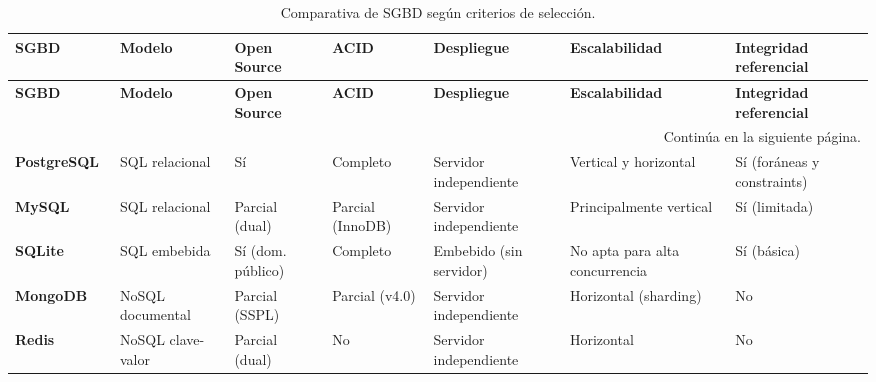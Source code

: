 \begin{center}
	\setlength{\tabcolsep}{4pt}
	\begin{longtable}{|p{2.3cm}|p{2cm}|p{1.3cm}|p{1.5cm}|p{2cm}|p{2.5cm}|p{2cm}|}
		\caption{Comparativa de SGBD según criterios de selección.}
		\label{tab:comparacion-bd} \\
		
		\hline
		\small\textbf{SGBD} &
		\small\textbf{Modelo} &
		\small\textbf{Open Source} &
		\small\textbf{ACID} &
		\small\textbf{Despliegue} &
		\small\textbf{Escalabilidad} &
		\small\textbf{Integridad referencial} \\
		\hline
		\endfirsthead
		
		\hline
		\small\textbf{SGBD} &
		\small\textbf{Modelo} &
		\small\textbf{Open Source} &
		\small\textbf{ACID} &
		\small\textbf{Despliegue} &
		\small\textbf{Escalabilidad} &
		\small\textbf{Integridad referencial} \\
		\hline
		\endhead
		
		\hline
		\multicolumn{7}{r}{\small Continúa en la siguiente página.} \\
		\endfoot
		
		\hline
		\endlastfoot
		
		\small\textbf{PostgreSQL}~\cite{postgresql}
		& \small SQL relacional
		& \small Sí
		& \small Completo
		& \small Servidor independiente
		& \small Vertical y horizontal
		& \small Sí (foráneas y constraints) \\
		\hline
		
		\small\textbf{MySQL}~\cite{mysql}
		& \small SQL relacional
		& \small Parcial (dual)
		& \small Parcial (InnoDB)
		& \small Servidor independiente
		& \small Principalmente vertical
		& \small Sí (limitada) \\
		\hline
		
		\small\textbf{SQLite}~\cite{sqlite}
		& \small SQL embebida
		& \small Sí (dom. público)
		& \small Completo
		& \small Embebido (sin servidor)
		& \small No apta para alta concurrencia
		& \small Sí (básica) \\
		\hline
		
		\small\textbf{MongoDB}~\cite{mongodb}
		& \small NoSQL documental
		& \small Parcial (SSPL)
		& \small Parcial (v4.0)
		& \small Servidor independiente
		& \small Horizontal (sharding)
		& \small No \\
		\hline
		
		\small\textbf{Redis}~\cite{redis}
		& \small NoSQL clave-valor
		& \small Parcial (dual)
		& \small No
		& \small Servidor independiente
		& \small Horizontal
		& \small No \\
		\hline
		
	\end{longtable}
\end{center}

